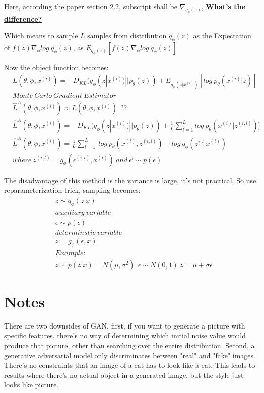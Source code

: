 \documentclass{article}
\begin{document}
Here, according the paper section 2.2, subscript shall be $\nabla_{q_\phi(z)}$, \underline{\textbf{What's the difference?}}

Which means to sample $L$ samples from distribution $q_\phi(z)$ as the Expectation of $f(z)\nabla_\phi log\ q_{\phi}(z)$, as $E_{q_\phi(z)}[f(z)\nabla_\phi log\ q_{\phi}(z)]$


Now the object function becomes:
\begin{equation}
\begin{split}
&L(\theta, \phi, x^{(i)}) =- D_{KL}(q_\phi(z|x^{(i)})||p_\theta(z)) + E_{q_\phi(z|x^{(i)})}[log\ p_\theta(x^{(i)}|z)] \\
&Monte\ Carlo\ Gradient\ Estimator\\
&\hat{L}^A(\theta, \phi, x^{(i)}) \approx L(\theta, \phi, x^{(i)})\ \ ??\\
&\hat{L}^A(\theta, \phi, x^{(i)}) = - D_{KL}(q_\phi(z|x^{(i)})||p_\theta(z)) + \frac{1}{L}\sum_{l=1}^{L} log\ p_\theta(x^{(i)}|z^{(i,l)})]\\
&\hat{L}^A(\theta, \phi, x^{(i)}) = \frac{1}{L}\sum^L_{l=1}\ log\ p_\theta(x^{(i)},z^{(i,l)}) - log\ q_\phi (z^{i,l}|x^{(i)})\\
&where\ z^{(i, l)}=g_\phi(\epsilon^{(i,l)}, x^{(i)})\ and\ \epsilon^{l} \sim p(\epsilon)
\end{split}
\end{equation}


The disadvantage of this method is the variance is large, it's not practical. So use reparameterization trick, sampling becomes:
\begin{equation}
\begin{split}
&z \sim q_\phi(z|x)\\
&auxiliary\ variable\\
&\epsilon \sim p(\epsilon)\\
&determinstic\ variable\\
&z = g_\phi(\epsilon, x)\\
&Example:\\
&z \sim p(z|x) = N(\mu, \sigma^2)\ \ \epsilon \sim N(0,1)\ z=\mu +\sigma \epsilon
\end{split}
\end{equation}



\section{Notes}
There are two downsides of GAN. first, if you want to generate a picture with specific features, there's no way of determining which initial noise value would produce that picture, other than searching over the entire distribution. Second, a generative adversarial model only discriminates between "real" and "fake" images. There's no constraints that an image of a cat has to look like a cat. This leads to results where there's no actual object in a generated image, but the style just looks like picture.
\end{document}
